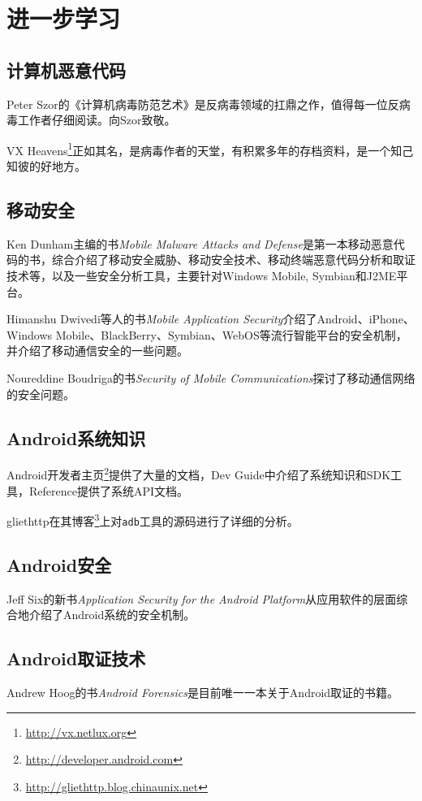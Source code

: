 \chapter{进一步学习}
\section*{计算机恶意代码}
Peter Szor的《计算机病毒防范艺术》\cite{art_virus}是反病毒领域的扛鼎之作，值得每一位反病毒工作者仔细阅读。向Szor致敬。

VX Heavens\footnote{\url{http://vx.netlux.org}}正如其名，是病毒作者的天堂，有积累多年的存档资料，是一个知己知彼的好地方。

\section*{移动安全}
Ken Dunham主编的书{\it Mobile Malware Attacks and Defense}\cite{mobile_malware}是第一本移动恶意代码的书，综合介绍了移动安全威胁、移动安全技术、移动终端恶意代码分析和取证技术等，以及一些安全分析工具，主要针对Windows Mobile, Symbian和J2ME平台。

Himanshu Dwivedi等人的书{\it Mobile Application Security}\cite{mobile_app_security}介绍了Android、iPhone、Windows Mobile、BlackBerry、Symbian、WebOS等流行智能平台的安全机制，并介绍了移动通信安全的一些问题。

Noureddine Boudriga的书{\it Security of Mobile Communications}\cite{security_mobile_comm}探讨了移动通信网络的安全问题。

\section*{Android系统知识}
Android开发者主页\footnote{\url{http://developer.android.com}}提供了大量的文档，Dev Guide中介绍了系统知识和SDK工具，Reference提供了系统API文档。

gliethttp在其博客\footnote{\url{http://gliethttp.blog.chinaunix.net}}上对\lstinline!adb!工具的源码进行了详细的分析。

\section*{Android安全}
Jeff Six的新书{\it Application Security for the Android Platform}\cite{android_app_security}从应用软件的层面综合地介绍了Android系统的安全机制。

\section*{Android取证技术}
Andrew Hoog的书{\it Android Forensics}\cite{android_forensics}是目前唯一一本关于Android取证的书籍。

